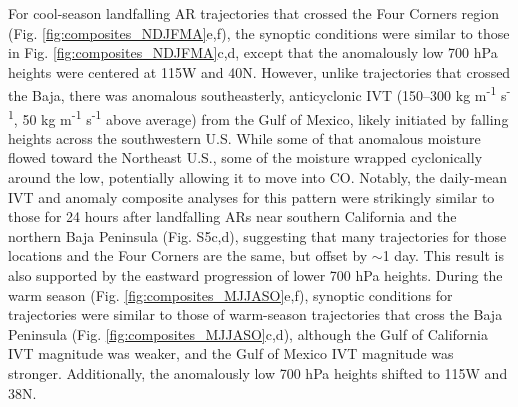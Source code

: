 \documentclass[draft]{agujournal2019}
\begin{document}
For cool-season landfalling AR trajectories that crossed the Four Corners region (Fig. \ref{fig:composites_NDJFMA}e,f), the synoptic conditions were similar to those in Fig. \ref{fig:composites_NDJFMA}c,d, except that the anomalously low 700 hPa heights were centered at 115\textdegree W and 40\textdegree N. However, unlike trajectories that crossed the Baja, there was anomalous southeasterly, anticyclonic IVT (150--300 kg m\textsuperscript{-1} s\textsuperscript{-1}, 50 kg m\textsuperscript{-1} s\textsuperscript{-1} above average) from the Gulf of Mexico, likely initiated by falling heights across the southwestern U.S. While some of that anomalous moisture flowed toward the Northeast U.S., some of the moisture wrapped cyclonically around the low, potentially allowing it to move into CO. Notably, the daily-mean IVT and anomaly composite analyses for this pattern were strikingly similar to those for 24 hours after landfalling ARs near southern California and the northern Baja Peninsula (Fig. S5c,d), suggesting that many trajectories for those locations and the Four Corners are the same, but offset by $\sim$1 day. This result is also supported by the eastward progression of lower 700 hPa heights. During the warm season (Fig. \ref{fig:composites_MJJASO}e,f), synoptic conditions for trajectories were similar to those of warm-season trajectories that cross the Baja Peninsula (Fig. \ref{fig:composites_MJJASO}c,d), although the Gulf of California IVT magnitude was weaker, and the Gulf of Mexico IVT magnitude was stronger. Additionally, the anomalously low 700 hPa heights shifted to 115\textdegree W and 38\textdegree N. 
\end{document}
